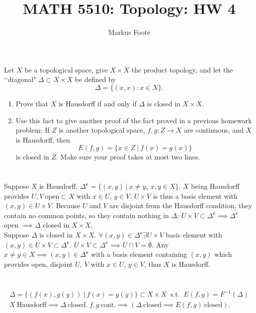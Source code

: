\documentclass{jhwhw}
\title{MATH 5510: Topology: HW 4}
\author{Markus Foote}
\begin{document}
\problem{}%
Let $X$ be a topological space, give $X\times X$ the product topology, and let the \lq\lq diagonal"  $\Delta\subset X\times X$ be defined by 
$$
\Delta =\{ (x,x): x\in X\}.
$$
\begin{enumerate}
	
	\item Prove that $X$ is Hausdorff if and only if $\Delta$ is closed in $X\times X$.
	
	\item Use this fact to give another proof of the fact proved in a previous homework problem:  If $Z$ is another topological space, $f,g:Z\to X$ are continuous, and $X$ is Hausdorff, then
	$$
	E(f,g) = \{x\in Z \ | \ f(x) = g(x)\}
	$$ 
	is closed in $Z$.  Make sure your proof takes at most two lines.
\end{enumerate}
\solution{}
\part{}
Suppose $X$ is Hausdorff. $\Delta^{\mathbf{c}}=\{(x,y)\ | \ x\ne y,\ x,y\in X\}$. $X$ being Hausdorff provides $U,V\ \mathrm{ open }\subset X$ with $x\in U$, $y\in V$. $U\times V$ is thus a basis element with $(x,y) \in U\times V$. Because $U$ and $V$ are disjoint from the Hausdorff condition, they contain no common points, so they contain nothing in $\Delta$: $U\times V \subset \Delta^{\mathbf{c}}\implies \Delta^{\mathbf{c}}$ open $\implies \Delta$ closed in $X\times X$.
\\

Suppose $\Delta$ is closed in $X\times X$. $\forall (x,y)\in \Delta^{\mathbf{c}} \exists U\times V$ basis element with $(x,y)\in U\times V \subset \Delta^{\mathbf{c}}$. $U\times V \subset \Delta^{\mathbf{c}} \implies U\cap V=\emptyset$. Any $x\ne y\in X \implies (x,y)\in \Delta^{\mathbf{c}}$ with a basis element containing $(x,y)$ which provides open, disjoint $U,\ V$ with $x\in U$, $y\in V$, thus $X$ is Hausdorff.


\part{}
\begin{gather}
\Delta = \{(f(x),g(y))\ | \ f(x) = g(y)\} \subset X \times X \ \text{ s.t. }\ E(f,g) = F^{-1}(\Delta) \\
X \ \text{Hausdorff}\implies \Delta \ \text{closed.} \ f,g \ \text{cont.} \implies \left( \Delta\ \text{closed} \implies E(f,g)\ \text{closed} \right).
\end{gather}
\\
\end{document}
